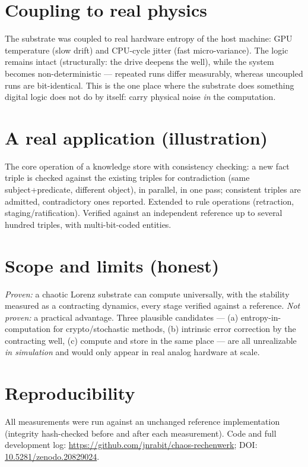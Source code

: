 \documentclass[11pt]{article}
\begin{document}
\section{Coupling to real physics}
\label{sec:entropy}
The substrate was coupled to real hardware entropy of the host machine: GPU temperature (slow
drift) and CPU-cycle jitter (fast micro-variance). The logic remains intact (structurally: the
drive deepens the well), while the system becomes non-deterministic --- repeated runs differ
measurably, whereas uncoupled runs are bit-identical. This is the one place where the substrate
does something digital logic does not do by itself: carry physical noise \emph{in} the
computation.

\section{A real application (illustration)}
The core operation of a knowledge store with consistency checking: a new fact triple is checked
against the existing triples for contradiction (same subject+predicate, different object), in
parallel, in one pass; consistent triples are admitted, contradictory ones reported. Extended to
rule operations (retraction, staging/ratification). Verified against an independent reference
up to several hundred triples, with multi-bit-coded entities.

\section{Scope and limits (honest)}
\emph{Proven:} a chaotic Lorenz substrate can compute universally, with the stability measured
as a contracting dynamics, every stage verified against a reference. \emph{Not proven:} a
practical advantage. Three plausible candidates --- (a) entropy-in-computation for
crypto/stochastic methods, (b) intrinsic error correction by the contracting well, (c) compute
and store in the same place --- are all unrealizable \emph{in simulation} and would only appear
in real analog hardware at scale.

\section{Reproducibility}
All measurements were run against an unchanged reference implementation (integrity hash-checked
before and after each measurement). Code and full development log:
\url{https://github.com/jnrabit/chaos-rechenwerk}; DOI:
\href{https://doi.org/10.5281/zenodo.20829024}{10.5281/zenodo.20829024}.
\end{document}
